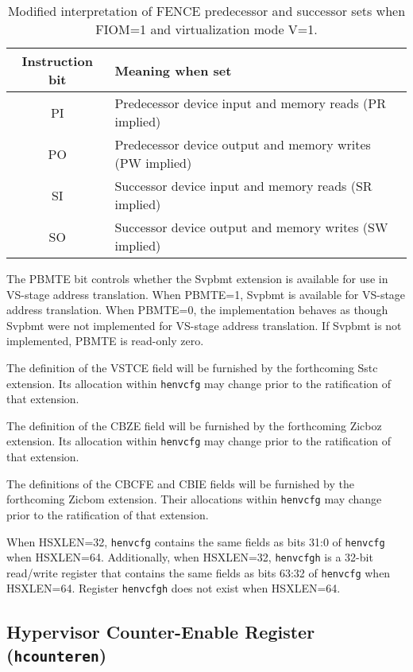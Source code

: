 \begin{table}[h!]
\begin{center}
\begin{tabular}{|c|l|}
\hline
Instruction bit & Meaning when set \\
\hline
PI & Predecessor device input and memory reads   (PR implied) \\
PO & Predecessor device output and memory writes (PW implied) \\
\hline
SI & Successor device input and memory reads     (SR implied) \\
SO & Successor device output and memory writes   (SW implied) \\
\hline
\end{tabular}
\end{center}
\vspace{-0.1in}
\caption{%
Modified interpretation of FENCE predecessor and successor sets when
FIOM=1 and virtualization mode V=1.%
}
\label{tab:henvcfg-FIOM}
\end{table}

The PBMTE bit controls whether the Svpbmt extension is available for use in
VS-stage address translation.
When PBMTE=1, Svpbmt is available for VS-stage address translation.
When PBMTE=0, the implementation behaves as though Svpbmt were not implemented
for VS-stage address translation.
If Svpbmt is not implemented, PBMTE is read-only zero.

The definition of the VSTCE field will be furnished by the
forthcoming Sstc extension.
Its allocation within {\tt henvcfg} may change prior to the ratification
of that extension.

The definition of the CBZE field will be furnished by the
forthcoming Zicboz extension.
Its allocation within {\tt henvcfg} may change prior to the ratification
of that extension.

The definitions of the CBCFE and CBIE fields will be furnished by the
forthcoming Zicbom extension.
Their allocations within {\tt henvcfg} may change prior to the ratification
of that extension.

When HSXLEN=32, {\tt henvcfg} contains the same fields as bits 31:0
of {\tt henvcfg} when HSXLEN=64.
Additionally, when HSXLEN=32, {\tt henvcfgh} is a 32-bit read/write register that
contains the same fields as bits 63:32 of {\tt henvcfg} when
HSXLEN=64.
Register {\tt henvcfgh} does not exist when HSXLEN=64.

\subsection{Hypervisor Counter-Enable Register ({\tt hcounteren})}

